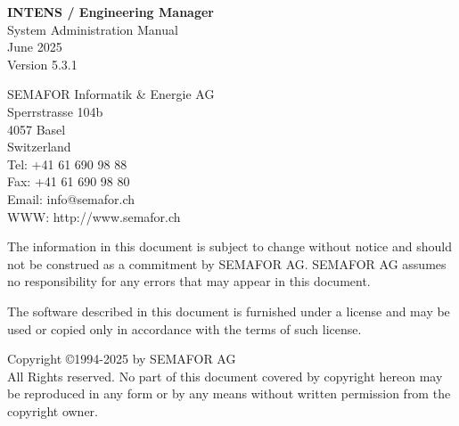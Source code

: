 \documentclass[a4paper,DIV=12,11pt,parskip=half]{scrartcl}
\makeatletter
\def\doc@version{Version 5.3.1}
\def\pub@date{June 2025}
\makeatother
\begin{document}
\renewcommand{\arraystretch}{1.5}
\begin{titlepage}
\begin{center}
\vspace*{1.5cm}

{\bfseries \Huge INTENS / Engineering Manager\\[3ex]}
{\LARGE System Administration Manual\\[3ex]}
\pub@date \\
\doc@version \\

\end{center}
\vspace{8cm}
SEMAFOR Informatik \& Energie AG\\
Sperrstrasse 104b\\
4057 Basel\\
Switzerland\\[2ex]
Tel: +41 61 690 98 88\\
Fax: +41 61 690 98 80\\
Email: info@semafor.ch\\
WWW: http://www.semafor.ch
\end{titlepage}
\thispagestyle{empty}
\vspace{2cm}

The information in this document is subject to change without notice and
should not be construed as a commitment by SEMAFOR AG. SEMAFOR AG
assumes no responsibility for any errors that may appear in this document.

The software described in this document is furnished under a license and
may be used or copied only in accordance with the terms of such license.

Copyright \copyright 1994-2025 by SEMAFOR AG\\[2ex]
All Rights reserved. No part of this document covered by copyright
hereon may be reproduced in any form or by any means without written permission
from the copyright owner.\\[4ex]
\end{document}
